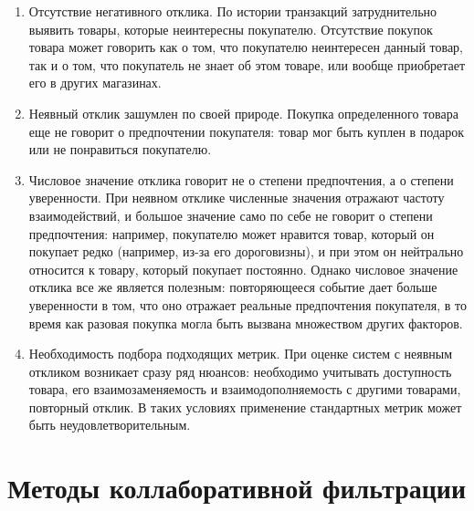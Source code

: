 \documentclass{article}
\begin{document}
\begin{enumerate}
 \item Отсутствие негативного отклика. По истории транзакций затруднительно выявить товары, которые неинтересны покупателю. Отсутствие покупок товара может говорить как о том, что покупателю неинтересен данный товар, так и о том, что покупатель не знает об этом товаре, или вообще приобретает его в других магазинах.

\item Неявный отклик зашумлен по своей природе. Покупка определенного товара еще не говорит о предпочтении покупателя: товар мог быть куплен в подарок или не понравиться покупателю.

\item Числовое значение отклика говорит не о степени предпочтения, а о степени уверенности. При неявном отклике численные значения отражают частоту взаимодействий, и большое значение само по себе не говорит о степени предпочтения: например, покупателю может нравится товар, который он покупает редко (например, из-за его дороговизны), и при этом он нейтрально относится к товару, который покупает постоянно. Однако числовое значение отклика все же является полезным: повторяющееся событие дает больше уверенности в том, что оно отражает реальные предпочтения покупателя, в то время как разовая покупка могла быть вызвана множеством других факторов.

\item Необходимость подбора подходящих метрик. При оценке систем с неявным откликом возникает сразу ряд нюансов: необходимо учитывать доступность товара, его взаимозаменяемость и взаимодополняемость с другими товарами, повторный отклик. В таких условиях применение стандартных метрик может быть неудовлетворительным.
\end{enumerate}

\section{Методы коллаборативной фильтрации}
\end{document}
